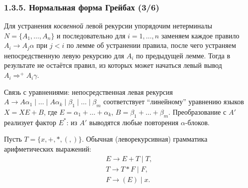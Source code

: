 \documentclass[mathserif,12pt,aspectratio=169]{beamer}
\begin{document}
\begin{frame}
\frametitle{1.3.5. Нормальная форма Грейбах (3/6)}
\begin{remark}
Для устранения \emph{косвенной} левой рекурсии упорядочим нетерминалы
$N=\{A_1,\dots,A_n\}$ и последовательно для $i=1,\dots,n$ заменяем
каждое правило $A_i\to A_j\alpha$ при $j<i$ по лемме об устранении правила,
после чего устраняем непосредственную левую рекурсию для $A_i$
по предыдущей лемме. Тогда в результате не остаётся правил,
из которых может начаться левый вывод $A_i\Rightarrow^+ A_i\gamma$.
\end{remark}
\begin{digress}
Связь с уравнениями: непосредственная левая рекурсия
$A\to A\alpha_1\mid\dots\mid A\alpha_k\mid \beta_1\mid\dots\mid \beta_m$
соответствует ``линейному'' уравнению языков $X=XE+B$,
где $E=\alpha_1+\dots+\alpha_k$, $B=\beta_1+\dots+\beta_m$.
Преобразование с $A'$ реализует фактор $E^*$: из $A'$ выводятся любые повторения $\alpha$-блоков.
\end{digress}

\begin{example}
Пусть $T=\{x,+,\ast,(,)\}$.
Обычная (леворекурсивная) грамматика арифметических выражений:
\[
\begin{array}{l}
E\to E+T \mid T,\\
T\to T\ast F \mid F,\\
F\to (E)\mid x.
\end{array}
\]
\end{example}
\end{frame}
\end{document}
